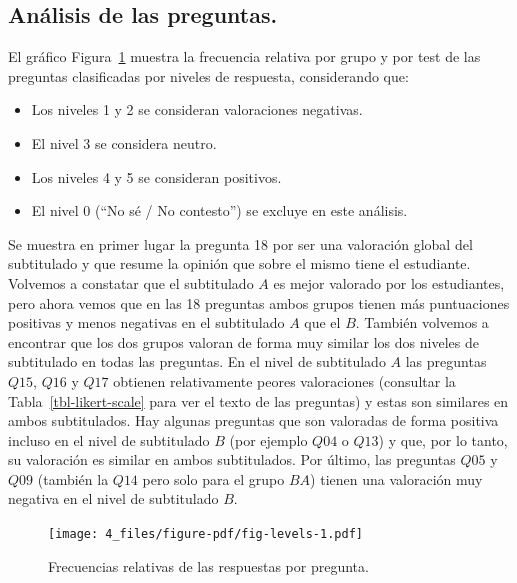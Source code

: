 \documentclass[
  12pt,
  a4paper,
  extrafontsizes,
  onecolumn,
  openright,
  table]{memoir}
\providecommand{\tightlist}{%
  \setlength{\itemsep}{0pt}\setlength{\parskip}{0pt}}\usepackage{longtable,booktabs,array}
\begin{document}
\hypertarget{anuxe1lisis-de-las-preguntas.}{%
\subsection{Análisis de las
preguntas.}\label{anuxe1lisis-de-las-preguntas.}}

El gráfico Figura~\ref{fig-levels} muestra la frecuencia relativa por
grupo y por test de las preguntas clasificadas por niveles de respuesta,
considerando que:

\begin{itemize}
\tightlist
\item
  Los niveles 1 y 2 se consideran valoraciones negativas.
\item
  El nivel 3 se considera neutro.
\item
  Los niveles 4 y 5 se consideran positivos.
\item
  El nivel 0 (\enquote{No sé / No contesto}) se excluye en este
  análisis.
\end{itemize}

Se muestra en primer lugar la pregunta 18 por ser una valoración global
del subtitulado y que resume la opinión que sobre el mismo tiene el
estudiante. Volvemos a constatar que el subtitulado \(A\) es mejor
valorado por los estudiantes, pero ahora vemos que en las 18 preguntas
ambos grupos tienen más puntuaciones positivas y menos negativas en el
subtitulado \(A\) que el \(B\). También volvemos a encontrar que los dos
grupos valoran de forma muy similar los dos niveles de subtitulado en
todas las preguntas. En el nivel de subtitulado \(A\) las preguntas
\(Q15\), \(Q16\) y \(Q17\) obtienen relativamente peores valoraciones
(consultar la Tabla~\ref{tbl-likert-scale} para ver el texto de las
preguntas) y estas son similares en ambos subtitulados. Hay algunas
preguntas que son valoradas de forma positiva incluso en el nivel de
subtitulado \(B\) (por ejemplo \(Q04\) o \(Q13\)) y que, por lo tanto,
su valoración es similar en ambos subtitulados. Por último, las
preguntas \(Q05\) y \(Q09\) (también la \(Q14\) pero solo para el grupo
\(BA\)) tienen una valoración muy negativa en el nivel de subtitulado
\(B\).

\begin{figure}[h]

{\centering \texttt{[image: 4\_files/figure-pdf/fig-levels-1.pdf]}

}

\caption{\label{fig-levels}Frecuencias relativas de las respuestas por
pregunta.}

\end{figure}
\end{document}

